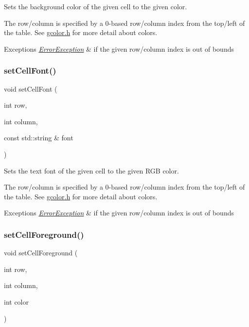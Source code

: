 Sets the background color of the given cell to the given color. 

The row/column is specified by a 0-\/based row/column index from the top/left of the table. See \mbox{\hyperlink{gcolor_8h_source}{gcolor.\+h}} for more detail about colors. 
\begin{DoxyExceptions}{Exceptions}
{\em \mbox{\hyperlink{classErrorException}{Error\+Exception}}} & if the given row/column index is out of bounds \\
\hline
\end{DoxyExceptions}
\mbox{\label{classGTable_a8c3d80b0163f465c7306b075d5895313}} 
\subsubsection{\texorpdfstring{set\+Cell\+Font()}{setCellFont()}}
{\footnotesize\ttfamily void set\+Cell\+Font (\begin{DoxyParamCaption}\item[{int}]{row,  }\item[{int}]{column,  }\item[{const std\+::string \&}]{font }\end{DoxyParamCaption})\hspace{0.3cm}{\ttfamily [virtual]}}



Sets the text font of the given cell to the given R\+GB color. 

The row/column is specified by a 0-\/based row/column index from the top/left of the table. See \mbox{\hyperlink{gcolor_8h_source}{gcolor.\+h}} for more detail about colors. 
\begin{DoxyExceptions}{Exceptions}
{\em \mbox{\hyperlink{classErrorException}{Error\+Exception}}} & if the given row/column index is out of bounds \\
\hline
\end{DoxyExceptions}
\mbox{\label{classGTable_a19969b2f2b0cbf219333b02c047b2e7e}} 
\subsubsection{\texorpdfstring{set\+Cell\+Foreground()}{setCellForeground()}\hspace{0.1cm}{\footnotesize\ttfamily [1/2]}}
{\footnotesize\ttfamily void set\+Cell\+Foreground (\begin{DoxyParamCaption}\item[{int}]{row,  }\item[{int}]{column,  }\item[{int}]{color }\end{DoxyParamCaption})\hspace{0.3cm}{\ttfamily [virtual]}}



